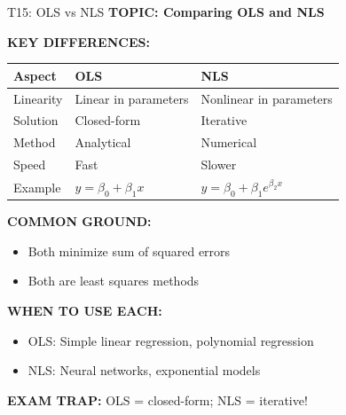 \documentclass[8pt]{beamer}
\begin{document}
	\begin{frame}{T15: OLS vs NLS}
		\fontsize{6.5}{7.5}\selectfont
		\textbf{TOPIC: Comparing OLS and NLS}
		
		\vspace{0.1cm}
		\textbf{KEY DIFFERENCES:}
		\begin{tabular}{|p{2.5cm}|p{3cm}|p{3cm}|}
			\hline
			\textbf{Aspect} & \textbf{OLS} & \textbf{NLS} \\
			\hline
			Linearity & Linear in parameters & Nonlinear in parameters \\
			\hline
			Solution & Closed-form & Iterative \\
			\hline
			Method & Analytical & Numerical \\
			\hline
			Speed & Fast & Slower \\
			\hline
			Example & $y = \beta_0 + \beta_1 x$ & $y = \beta_0 + \beta_1 e^{\beta_2 x}$ \\
			\hline
		\end{tabular}
		
		\vspace{0.1cm}
		\textbf{COMMON GROUND:}
		\begin{itemize}
			\item Both minimize sum of squared errors
			\item Both are least squares methods
		\end{itemize}
		
		\vspace{0.1cm}
		\textbf{WHEN TO USE EACH:}
		\begin{itemize}
			\item \textcolor{myblue}{OLS:} Simple linear regression, polynomial regression
			\item \textcolor{myblue}{NLS:} Neural networks, exponential models
		\end{itemize}
		
		\textcolor{myred}{\textbf{EXAM TRAP:}} OLS = \textcolor{myblue}{closed-form}; NLS = \textcolor{myblue}{iterative}!
	\end{frame}
	
\end{document}
